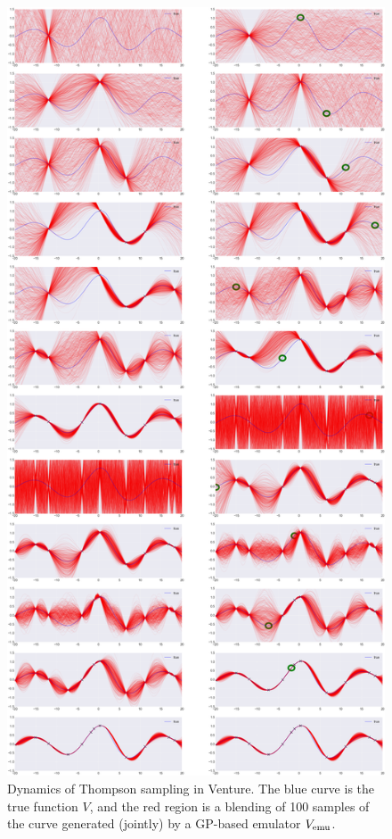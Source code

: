 \begin{figure}
\centering
    \includegraphics[height=0.8\textheight]{figs/BayesOpt_gpmem_sequence.png}
    \caption{
      Dynamics of Thompson sampling in Venture.
      The blue curve is the true function $V$, and the red region is a blending of 100 samples of the curve generated (jointly) by a GP-based emulator $V_{\textrm{emu}}$.
}
\end{figure}
